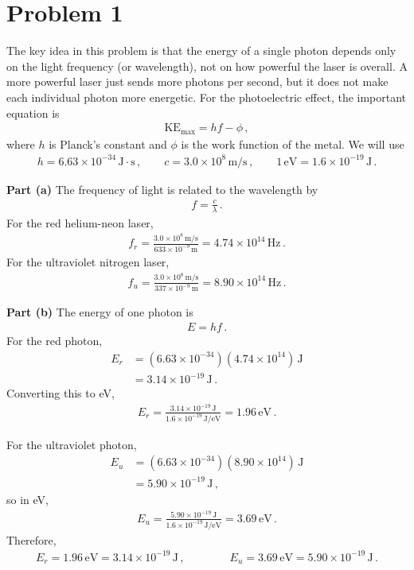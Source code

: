 \documentclass[11pt]{article}
\begin{document}
\section*{Problem 1}
The key idea in this problem is that the energy of a single photon depends only on the light frequency (or wavelength), not on how powerful the laser is overall. A more powerful laser just sends more photons per second, but it does not make each individual photon more energetic. For the photoelectric effect, the important equation is
\begin{align*}
\text{KE}_{\max} = hf - \phi\,,
\end{align*}
where $h$ is Planck's constant and $\phi$ is the work function of the metal. We will use
\begin{align*}
h = 6.63\times 10^{-34}\,\text{J}\cdot \text{s}\,,\qquad
c=3.0\times 10^8\,\text{m/s}\,,\qquad
1\,\text{eV}=1.6\times 10^{-19}\,\text{J}\,.
\end{align*}

\noindent\textbf{Part (a)} The frequency of light is related to the wavelength by
\begin{align*}
f = \frac{c}{\lambda}\,.
\end{align*}
For the red helium-neon laser,
\begin{align*}
f_r = \frac{3.0\times 10^8\,\text{m/s}}{633\times 10^{-9}\,\text{m}}
= 4.74\times 10^{14}\,\text{Hz}\,.
\end{align*}
For the ultraviolet nitrogen laser,
\begin{align*}
f_u = \frac{3.0\times 10^8\,\text{m/s}}{337\times 10^{-9}\,\text{m}}
= 8.90\times 10^{14}\,\text{Hz}\,.
\end{align*}

\noindent\textbf{Part (b)} The energy of one photon is
\begin{align*}
E = hf\,.
\end{align*}
For the red photon,
\begin{align*}
E_r &= (6.63\times 10^{-34})(4.74\times 10^{14})\,\text{J}\\
&= 3.14\times 10^{-19}\,\text{J}\,.
\end{align*}
Converting this to eV,
\begin{align*}
E_r = \frac{3.14\times 10^{-19}\,\text{J}}{1.6\times 10^{-19}\,\text{J/eV}}
= 1.96\,\text{eV}\,.
\end{align*}

For the ultraviolet photon,
\begin{align*}
E_u &= (6.63\times 10^{-34})(8.90\times 10^{14})\,\text{J}\\
&= 5.90\times 10^{-19}\,\text{J}\,,
\end{align*}
so in eV,
\begin{align*}
E_u = \frac{5.90\times 10^{-19}\,\text{J}}{1.6\times 10^{-19}\,\text{J/eV}}
= 3.69\,\text{eV}\,.
\end{align*}
Therefore,
\begin{align*}
E_r = 1.96\,\text{eV} = 3.14\times 10^{-19}\,\text{J}\,,\qquad\qquad
E_u = 3.69\,\text{eV} = 5.90\times 10^{-19}\,\text{J}\,.
\end{align*}
\end{document}
